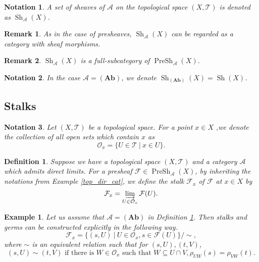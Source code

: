 \documentclass{article}
\newtheorem{definition}{Definition}[section]
\newtheorem{notation}{Notation}[section]
\newtheorem{remark}{Remark}[section]
\newtheorem{example}{Example}[section]
\numberwithin{equation}{section}
\DeclareMathOperator{\PreSh}{PreSh}
\DeclareMathOperator{\Sh}{Sh}
\begin{document}
\begin{notation}
A set of sheaves of $\mathcal{A}$ on the topological space $(X,\mathcal{T})$ is denoted as $\Sh_{\mathcal{A}}(X)$.
\end{notation}

\begin{remark}
As in the case of presheaves, $\Sh_\mathcal{A}(X)$ can be regarded as a category with sheaf morphisms.
\end{remark}

\begin{remark}
$\Sh_{\mathcal{A}}(X)$ is a full-subcategory of $\PreSh_{\mathcal{A}}(X)$.
\end{remark}

\begin{notation}
In the case $\mathcal{A}=(\mathbf{Ab})$, we denote $\Sh_{(\mathbf{Ab})}(X) = \Sh(X)$. 
\end{notation}

\subsection{Stalks}

\begin{notation}
Let $(X,\mathcal{T})$ be a topological space. For a point $x\in X$ ,we denote the collection of all open sets which contain $x$ as
\begin{equation*}
\mathcal{O}_x = \{U\in\mathcal{T}\:|\: x\in U\}.
\end{equation*}
\end{notation}

\begin{definition}
\label{def_stalk}
Suppose we have a topological space $(X,\mathcal{T})$ and a category $\mathcal{A}$ which admits direct limits. For a presheaf $\mathcal{F}\in\PreSh_{\mathcal{A}}(X)$, by inheriting the notations from Example \ref{top_dir_cat}, we define the stalk $\mathcal{F}_x$ of $\mathcal{F}$ at $x\in X$ by
\begin{equation*}
\mathcal{F}_x = \varinjlim_{U\in\mathcal{O}_x}\mathcal{F}(U).
\end{equation*}
\end{definition}

\begin{example}
\label{stalk_ex1}
Let us assume that $\mathcal{A}=(\mathbf{Ab})$ in Definition \ref{def_stalk}. Then stalks and germs can be constructed explicitly in the following way.
\begin{equation*}
\mathcal{F}_x = \{(s,U)\:|\: U\in\mathcal{O}_x, s\in\mathcal{F}(U)\}/\sim,
\end{equation*}
where $\sim$ is an equivalent relation such that for $(s,U),(t,V)$,
\begin{equation*}
(s,U)\sim(t,V) \text{ if there is } W\in\mathcal{O}_x \text{ such that } W\subseteq U\cap V, \rho_{UW}(s)=\rho_{VW}(t).
\end{equation*}
\end{example}
\end{document}
